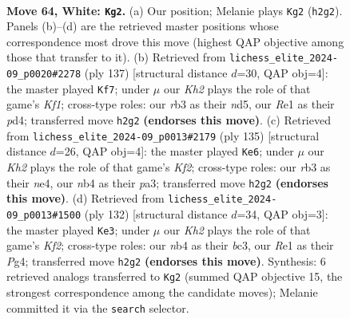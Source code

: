 \documentclass[11pt]{article}
\begin{document}
\clearpage

\begin{figure}[p]\centering
\begin{subfigure}{0.46\textwidth}\centering
\resizebox{\linewidth}{!}{%
\newchessgame
\chessboard[
  setfen={3R4/1p5p/1k4pP/p4p2/1n3P2/1r6/7K/4R3 w - - 15 64},
  showmover=false,
  pgfstyle=straightmove, color=movearrow, markmove={h2-g2}
]}
\caption{}
\end{subfigure}\hfill
\begin{subfigure}{0.46\textwidth}\centering
\resizebox{\linewidth}{!}{%
\newchessgame
\chessboard[
  setfen={5k1K/7P/p7/P2N4/2pP4/2P5/1P6/8 b - - 0 69},
  showmover=false,
  pgfstyle=straightmove, color=movearrow, markmove={f8-f7}
]}
\caption{}
\end{subfigure}
\\[4pt]
\begin{subfigure}{0.46\textwidth}\centering
\resizebox{\linewidth}{!}{%
\newchessgame
\chessboard[
  setfen={8/5k2/6p1/6P1/4NK1P/P4P2/1P6/2r5 b - - 2 68},
  showmover=false,
  pgfstyle=straightmove, color=movearrow, markmove={f7-e6}
]}
\caption{}
\end{subfigure}\hfill
\begin{subfigure}{0.46\textwidth}\centering
\resizebox{\linewidth}{!}{%
\newchessgame
\chessboard[
  setfen={8/7p/7P/N2k2p1/1p2p1P1/2bp4/5K2/8 w - - 0 67},
  showmover=false,
  pgfstyle=straightmove, color=movearrow, markmove={f2-e3}
]}
\caption{}
\end{subfigure}
\caption{\textbf{Move 64, White: \texttt{Kg2}.} (a) Our position; Melanie plays \texttt{Kg2} (\texttt{h2g2}). Panels (b)--(d) are the retrieved master positions whose correspondence most drove this move (highest QAP objective among those that transfer to it). (b) Retrieved from \texttt{lichess\_elite\_2024-09\_p0020\#2278} (ply 137) [structural distance $d$=30, QAP obj=4]: the master played \texttt{Kf7}; under $\mu$ our \emph{Kh2} plays the role of that game's \emph{Kf1}; cross-type roles: our \emph{r}b3 as their \emph{n}d5, our \emph{R}e1 as their \emph{p}d4; transferred move \texttt{h2g2} \textbf{(endorses this move)}. (c) Retrieved from \texttt{lichess\_elite\_2024-09\_p0013\#2179} (ply 135) [structural distance $d$=26, QAP obj=4]: the master played \texttt{Ke6}; under $\mu$ our \emph{Kh2} plays the role of that game's \emph{Kf2}; cross-type roles: our \emph{r}b3 as their \emph{n}e4, our \emph{n}b4 as their \emph{p}a3; transferred move \texttt{h2g2} \textbf{(endorses this move)}. (d) Retrieved from \texttt{lichess\_elite\_2024-09\_p0013\#1500} (ply 132) [structural distance $d$=34, QAP obj=3]: the master played \texttt{Ke3}; under $\mu$ our \emph{Kh2} plays the role of that game's \emph{Kf2}; cross-type roles: our \emph{n}b4 as their \emph{b}c3, our \emph{R}e1 as their \emph{P}g4; transferred move \texttt{h2g2} \textbf{(endorses this move)}. Synthesis: 6 retrieved analogs transferred to \texttt{Kg2} (summed QAP objective 15, the strongest correspondence among the candidate moves); Melanie committed it via the \texttt{search} selector.}
\label{fig:thought-m126}
\end{figure}
\end{document}
